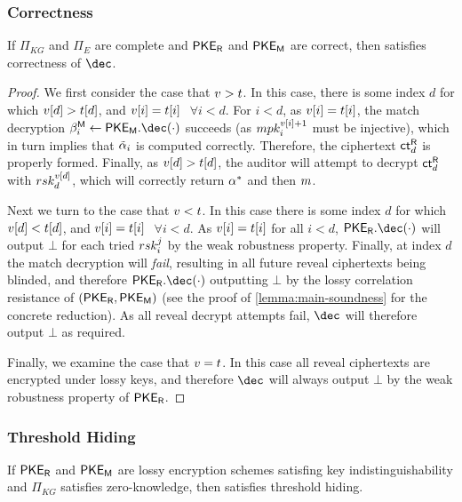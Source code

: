 \subsubsection{Correctness}
\begin{lemma}
	\label{lemma:main-correctness}
	If $\Pi_{KG}$ and $\Pi_{E}$ are complete and ${{\mathsf{PKE}_{{\mathsf{R}}}}}$ and ${{\mathsf{PKE}_{{\mathsf{M}}}}}$ are correct, then \schemename{} satisfies correctness of $\dec$.
\end{lemma}

\begin{proof}

	We first consider the case that $v > t$. In this case, there is some index $d$ for which $v[d] > t[d]$, and $v[i] = t[i]$ $ $ $\forall i < d$.
	For $i < d$, as $v[i] = t[i]$, the match decryption $\otpct_i^{\mat} \leftarrow \pkem.\dec(\cdot)$ succeeds (as $mpk_i^{v[i] + 1}$ must be injective), which in turn implies that  $\tilde{\alpha}_i$ is computed correctly.
	Therefore, the ciphertext $\mathsf{ct}_d^{{{\mathsf{R}}}}$ is properly formed.
	Finally, as $v[d] > t[d]$, the auditor will attempt to decrypt $\mathsf{ct}_d^{{{\mathsf{R}}}}$ with $rsk_d^{v[d]}$, which will correctly return $\alpha^*$ and then $m$.

	Next we turn to the case that $v < t$. In this case there is some index $d$ for which $v[d] < t[d]$, and $v[i] = t[i]$ $ $ $\forall i < d$.
	As $v[i] = t[i]$ for all $i < d$, $\pker.\dec(\cdot)$ will output $\bot$ for each tried $rsk_i^j$ by the weak robustness property.
	Finally, at index $d$ the match decryption will \emph{fail}, resulting in all future reveal ciphertexts being blinded, and therefore $\pker.\dec(\cdot)$ outputting $\bot$ by the lossy correlation resistance of $({{\mathsf{PKE}_{{\mathsf{R}}}}}, {{\mathsf{PKE}_{{\mathsf{M}}}}})$ (see the proof of \cref{lemma:main-soundness} for the concrete reduction).
	As all reveal decrypt attempts fail, $\dec$ will therefore output $\bot$ as required.

	Finally, we examine the case that $v = t$.
	In this case all reveal ciphertexts are encrypted under lossy keys, and therefore $\dec$ will always output $\bot$ by the weak robustness property of ${{\mathsf{PKE}_{{\mathsf{R}}}}}$.
\end{proof}

\subsubsection{Threshold Hiding}

\begin{lemma}
	\label{lemma:main-th}
	If ${{\mathsf{PKE}_{{\mathsf{R}}}}}$ and ${{\mathsf{PKE}_{{\mathsf{M}}}}}$ are lossy encryption schemes satisfing key indistinguishability and $\Pi_{KG}$ satisfies zero-knowledge, then \schemename{} satisfies threshold hiding.
\end{lemma}

